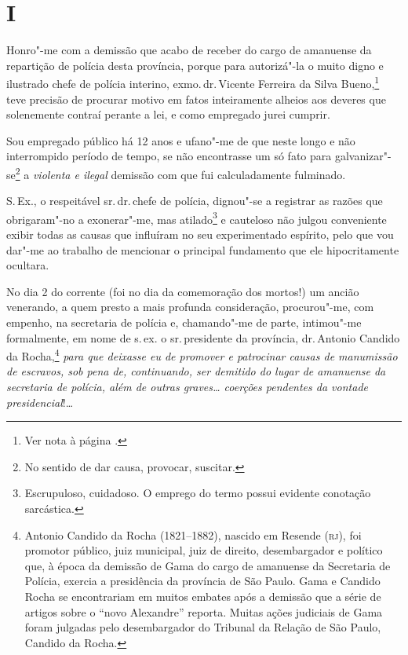 \section*{I}

\noindent{}Honro"-me com a demissão que acabo de receber do cargo de amanuense da
repartição de polícia desta província, porque para autorizá"-la o muito
digno e ilustrado chefe de polícia interino, exmo.\,dr.\,Vicente Ferreira
da Silva Bueno,\footnote{Ver nota à página \pageref{bueno}.} teve
precisão de procurar motivo em fatos inteiramente alheios aos deveres
que solenemente contraí perante a lei, e como empregado jurei cumprir.

Sou empregado público há 12 anos e ufano"-me de que neste longo e não
interrompido período de tempo, se não encontrasse um só fato para
galvanizar"-se\footnote{No sentido de dar causa, provocar, suscitar.} a
\emph{violenta e ilegal} demissão com que fui calculadamente fulminado.

S.\,Ex., o respeitável sr.\,dr.\,chefe de polícia, dignou"-se a registrar as
razões que obrigaram"-no a exonerar"-me, mas atilado\footnote{
  Escrupuloso, cuidadoso. O emprego do termo possui evidente conotação
  sarcástica.} e cauteloso não julgou conveniente exibir todas as causas
que influíram no seu experimentado espírito, pelo que vou dar"-me ao
trabalho de mencionar o principal fundamento que ele hipocritamente
ocultara.

No dia 2 do corrente (foi no dia da comemoração dos mortos!) um ancião
venerando, a quem presto a mais profunda consideração, procurou"-me, com
empenho, na secretaria de polícia e, chamando"-me de parte, intimou"-me
formalmente, em nome de s.\,ex. o sr.\,presidente da província, dr.\,Antonio Candido da Rocha,\footnote{Antonio Candido da Rocha
  (1821--1882), nascido em Resende (\textsc{rj}), foi promotor público, juiz
  municipal, juiz de direito, desembargador e político que, à época da
  demissão de Gama do cargo de amanuense da Secretaria de Polícia,
  exercia a presidência da província de São Paulo. Gama e Candido Rocha
  se encontrariam em muitos embates após a demissão que a série de
  artigos sobre o ``novo Alexandre'' reporta. Muitas ações judiciais de
  Gama foram julgadas pelo desembargador do Tribunal da Relação de São
  Paulo, Candido da Rocha.} \emph{para que deixasse eu de promover e
patrocinar causas de manumissão de escravos, sob pena de, continuando,
ser demitido do lugar de amanuense da secretaria de polícia, além de
outras graves\ldots{} coerções pendentes da vontade presidencial}!\ldots{}

